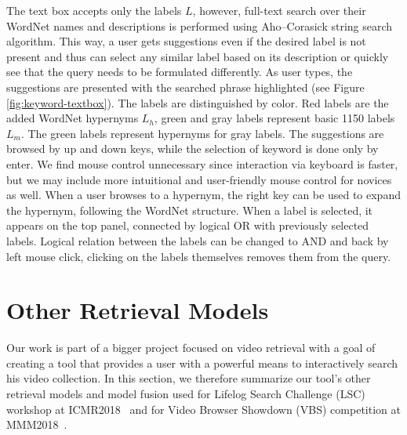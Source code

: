 The text box accepts only the labels $L$, however, full-text search over their WordNet names and descriptions is performed using Aho--Corasick string search algorithm. This way, a user gets suggestions even if the desired label is not present and thus can select any similar label based on its description or quickly see that the query needs to be formulated differently. As user types, the suggestions are presented with the searched phrase highlighted (see Figure \ref{fig:keyword-textbox}). The labels are distinguished by color. Red labels are the added WordNet hypernyms $L_h$, green and gray labels represent basic 1150 labels $L_m$. The green labels represent hypernyms for gray labels. The suggestions are browsed by up and down keys, while the selection of keyword is done only by enter. We find mouse control unnecessary since interaction via keyboard is faster, but we may include more intuitional and user-friendly mouse control for novices as well. When a user browses to a hypernym, the right key can be used to expand the hypernym, following the WordNet structure. When a label is selected, it appears on the top panel, connected by logical \textsf{OR} with previously selected labels. Logical relation between the labels can be changed to \textsf{AND} and back by left mouse click, clicking on the labels themselves removes them from the query.

\section{Other Retrieval Models}
Our work is part of a bigger project focused on video retrieval with a goal of creating a tool that provides a user with a powerful means to interactively search his video collection. In this section, we therefore summarize our tool's other retrieval models and model fusion used for Lifelog Search Challenge (LSC) workshop at ICMR2018~\cite{LokocLSC} and for Video Browser Showdown (VBS) competition at MMM2018~\cite{lokovc2018revisiting}.


